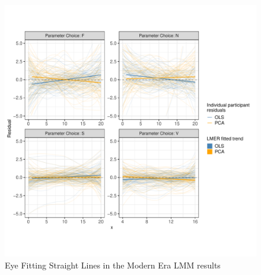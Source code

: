 \documentclass[print]{nuthesis}
\begin{document}
\begin{figure}[tbp]

{\centering \includegraphics[width=1\linewidth,]{thesis_files/figure-latex/eyefitting-lmer-residualplots-1} 

}

\caption{Eye Fitting Straight Lines in the Modern Era LMM results}\label{fig:eyefitting-lmer-residualplots}
\end{figure}
\end{document}
